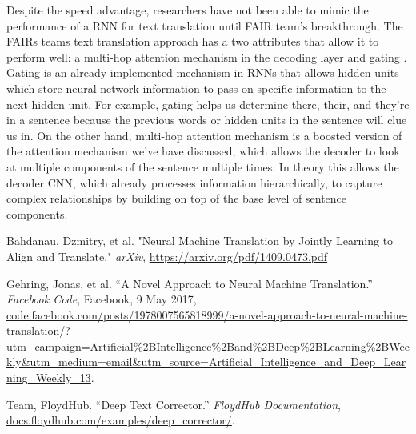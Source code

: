 \documentclass[11pt,a4paper]{scrartcl}
\theoremstyle{definition}
\begin{document}
Despite the speed advantage, researchers have not been able to mimic the performance of a RNN for text translation until FAIR team’s breakthrough. The FAIRs teams text translation approach has a two attributes that allow it to perform well: a multi-hop attention mechanism in the decoding layer and gating \cite{Gehring}. Gating is an already implemented mechanism in RNNs that allows hidden units which store neural network information to pass on specific information to the next hidden unit. For example, gating helps us determine there, their, and they’re in a sentence because the previous words or hidden units in the sentence will clue us in. On the other hand, multi-hop attention mechanism is a boosted version of the attention mechanism we’ve have discussed, which allows the decoder to look at multiple components of the sentence multiple times. In theory this allows the decoder CNN, which already processes information hierarchically, to capture complex relationships by building on top of the base level of sentence components. 

\vspace{1em}

\begin{thebibliography}{7}
 Bahdanau, Dzmitry, et al. "Neural Machine Translation by Jointly Learning to Align and Translate." \emph{arXiv}, \url{https://arxiv.org/pdf/1409.0473.pdf}

 Gehring, Jonas, et al. “A Novel Approach to Neural Machine Translation.” \emph{Facebook Code}, Facebook, 9 May 2017, \url{code.facebook.com/posts/1978007565818999/a-novel-approach-to-neural-machine-translation/?utm_campaign=Artificial%2BIntelligence%2Band%2BDeep%2BLearning%2BWeekly&utm_medium=email&utm_source=Artificial_Intelligence_and_Deep_Learning_Weekly_13}.

 Team, FloydHub. “Deep Text Corrector.” \emph{FloydHub Documentation}, \url{docs.floydhub.com/examples/deep_corrector/}.

\end{thebibliography}
\end{document}

